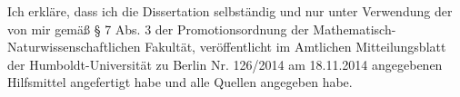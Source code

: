 \documentclass{simple-dissertation}
\begin{document}
\printbibliography

\StatementOfAuthorship{}

Ich erkläre, dass ich die Dissertation selbständig und nur unter Verwendung der von mir gemäß § 7 Abs. 3 der Promotionsordnung der Mathematisch-Naturwissenschaftlichen Fakultät, veröffentlicht im Amtlichen Mitteilungsblatt der Humboldt-Universität zu Berlin Nr. 126/2014 am 18.11.2014 angegebenen Hilfsmittel angefertigt habe und alle Quellen angegeben habe.

\SignatureLine{}
\end{document}
